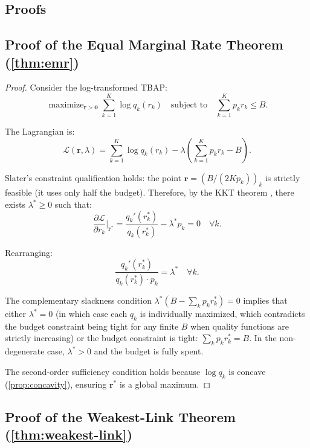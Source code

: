 \documentclass[11pt, a4paper, logo, copyright]{googledeepmind}
\DeclareMathOperator*{\maximize}{maximize}
\begin{document}
\begin{appendices}

\section{Proofs}\label{app:proofs}

\subsection{Proof of the Equal Marginal Rate Theorem (\texorpdfstring{\cref{thm:emr}}{Theorem 3.3})}

\begin{proof}
Consider the log-transformed TBAP:
\[
    \maximize_{\mathbf{r} > \mathbf{0}} \sum_{k=1}^K \log q_k(r_k) \quad \text{subject to} \quad \sum_{k=1}^K p_k r_k \leq B.
\]

The Lagrangian is:
\[
    \mathcal{L}(\mathbf{r}, \lambda) = \sum_{k=1}^K \log q_k(r_k) - \lambda \left(\sum_{k=1}^K p_k r_k - B\right).
\]

Slater's constraint qualification holds: the point $\mathbf{r} = (B/(2Kp_k))_k$ is strictly feasible (it uses only half the budget). Therefore, by the KKT theorem \citep{boyd2004, bertsekas1999}, there exists $\lambda^* \geq 0$ such that:
\[
    \frac{\partial \mathcal{L}}{\partial r_k}\bigg|_{\mathbf{r}^*} = \frac{q_k'(r_k^*)}{q_k(r_k^*)} - \lambda^* p_k = 0 \quad \forall k.
\]

Rearranging:
\[
    \frac{q_k'(r_k^*)}{q_k(r_k^*) \cdot p_k} = \lambda^* \quad \forall k.
\]

The complementary slackness condition $\lambda^* (B - \sum_k p_k r_k^*) = 0$ implies that either $\lambda^* = 0$ (in which case each $q_k$ is individually maximized, which contradicts the budget constraint being tight for any finite $B$ when quality functions are strictly increasing) or the budget constraint is tight: $\sum_k p_k r_k^* = B$. In the non-degenerate case, $\lambda^* > 0$ and the budget is fully spent.

The second-order sufficiency condition holds because $\log q_k$ is concave (\cref{prop:concavity}), ensuring $\mathbf{r}^*$ is a global maximum.
\end{proof}

\subsection{Proof of the Weakest-Link Theorem (\texorpdfstring{\cref{thm:weakest-link}}{Theorem 3.5})}


\end{appendices}
\end{document}
